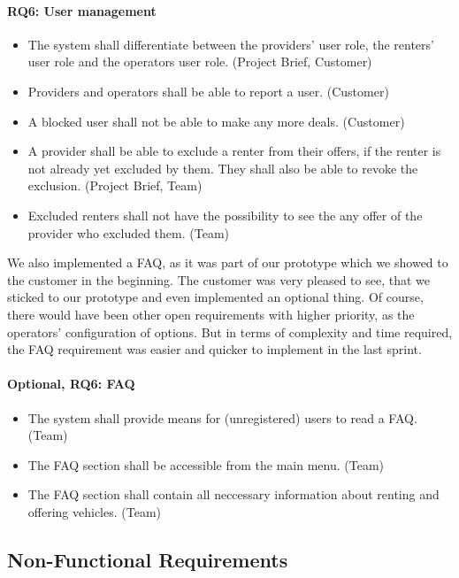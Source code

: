 \paragraph{RQ6: User management}
\begin{itemize}
    \item The system shall differentiate between the providers' user role, the renters' user role and the operators user role. (Project Brief, Customer)
    \item Providers and operators shall be able to report a user. (Customer)
    \item A blocked user shall not be able to make any more deals. (Customer)
    \item A provider shall be able to exclude a renter from their offers, if the renter is not already yet excluded by them. They shall also be able to revoke the exclusion. (Project Brief, Team)
    \item Excluded renters shall not have the possibility to see the any offer of the provider who excluded them. (Team)
\end{itemize}

We also implemented a FAQ, as it was part of our prototype which we showed to the customer in the beginning.
The customer was very pleased to see, that we sticked to our prototype and even implemented an optional thing.
Of course, there would have been other open requirements with higher priority, as the operators' configuration of options.
But in terms of complexity and time required, the FAQ requirement was easier and quicker to implement in the last sprint.

\paragraph{Optional, RQ6: FAQ}
\begin{itemize}
    \item  The system shall provide means for (unregistered) users to read a FAQ. (Team)
    \item The FAQ section shall be accessible from the main menu. (Team)
    \item The FAQ section shall contain all neccessary information about renting and offering vehicles. (Team)
\end{itemize}

\subsection{Non-Functional Requirements}
